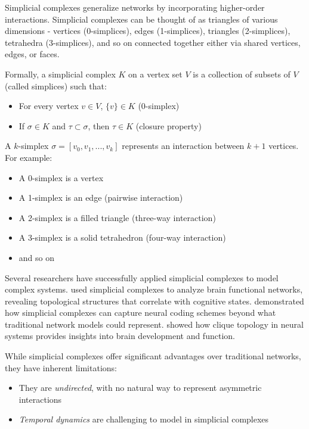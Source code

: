 Simplicial complexes generalize networks by incorporating higher-order interactions. Simplicial complexes can be thought of as triangles of various dimensions - vertices (0-simplices), edges (1-simplices), triangles (2-simplices), tetrahedra (3-simplices), and so on \citep{petri2014homological} connected together either via shared vertices, edges, or faces.

Formally, a simplicial complex $K$ on a vertex set $V$ is a collection of subsets of $V$ (called simplices) such that:
\begin{itemize}
    \item For every vertex $v \in V$, $\{v\} \in K$ (0-simplex)
    \item If $\sigma \in K$ and $\tau \subset \sigma$, then $\tau \in K$ (closure property)
\end{itemize}

A $k$-simplex $\sigma = [v_0, v_1, ..., v_k]$ represents an interaction between $k+1$ vertices. For example:
\begin{itemize}
    \item A 0-simplex is a vertex
    \item A 1-simplex is an edge (pairwise interaction)
    \item A 2-simplex is a filled triangle (three-way interaction)
    \item A 3-simplex is a solid tetrahedron (four-way interaction)
    \item and so on
\end{itemize}

Several researchers have successfully applied simplicial complexes to model complex systems. \citet{petri2014homological} used simplicial complexes to analyze brain functional networks, revealing topological structures that correlate with cognitive states. \citet{giusti2016two} demonstrated how simplicial complexes can capture neural coding schemes beyond what traditional network models could represent. \citet{sizemore2018importance} showed how clique topology in neural systems provides insights into brain development and function.

While simplicial complexes offer significant advantages over traditional networks, they have inherent limitations:
\begin{itemize}
    \item They are \textit{undirected}, with no natural way to represent asymmetric interactions
    \item \textit{Temporal dynamics} are challenging to model in simplicial complexes
\end{itemize}
